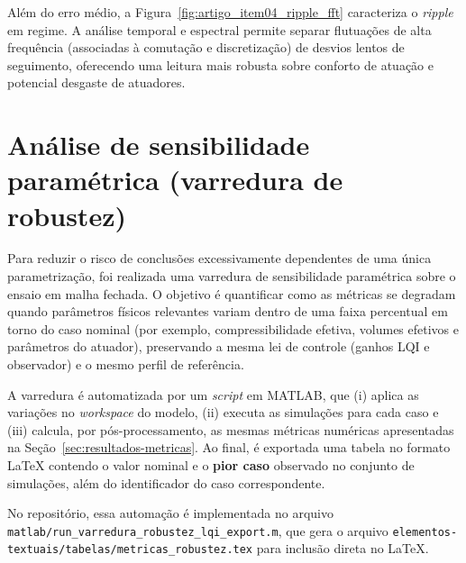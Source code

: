 Além do erro médio, a Figura~\ref{fig:artigo_item04_ripple_fft} caracteriza o \textit{ripple} em regime. A análise temporal e espectral permite separar flutuações de alta frequência (associadas à comutação e discretização) de desvios lentos de seguimento, oferecendo uma leitura mais robusta sobre conforto de atuação e potencial desgaste de atuadores.

\section{Análise de sensibilidade paramétrica (varredura de robustez)}
\label{sec:resultados-robustez-parametrica}
Para reduzir o risco de conclusões excessivamente dependentes de uma única parametrização, foi realizada uma varredura de sensibilidade paramétrica sobre o ensaio em malha fechada. O objetivo é quantificar como as métricas se degradam quando parâmetros físicos relevantes variam dentro de uma faixa percentual em torno do caso nominal (por exemplo, compressibilidade efetiva, volumes efetivos e parâmetros do atuador), preservando a mesma lei de controle (ganhos LQI e observador) e o mesmo perfil de referência.

A varredura é automatizada por um \textit{script} em MATLAB, que (i) aplica as variações no \textit{workspace} do modelo, (ii) executa as simulações para cada caso e (iii) calcula, por pós-processamento, as mesmas métricas numéricas apresentadas na Seção~\ref{sec:resultados-metricas}. Ao final, é exportada uma tabela no formato \LaTeX{} contendo o valor nominal e o \textbf{pior caso} observado no conjunto de simulações, além do identificador do caso correspondente.

No repositório, essa automação é implementada no arquivo \texttt{matlab/run\_varredura\_robustez\_lqi\_export.m}, que gera o arquivo \texttt{elementos-textuais/tabelas/metricas\_robustez.tex} para inclusão direta no \LaTeX{}.

\begin{table}[htbp]
    \centering
\end{table}

